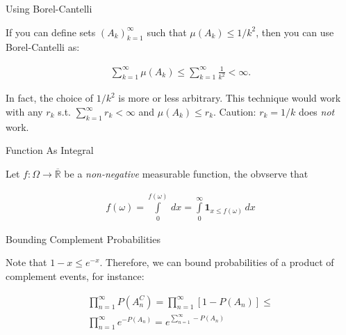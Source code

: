 \documentclass[10pt,landscape]{article}
\renewcommand{\leq}{\leqslant}
\newcommand{\Indicator}[1]{\mathbf{1}_{#1}}
\begin{document}
\begin{multicols}{3}
\begin{observation}{}{Using Borel-Cantelli}

    If you can define sets $(A_k)_{k=1}^{\infty}$ such that $\mu(A_k) \leq 1/k^2$, then you can use Borel-Cantelli as:

        \begin{align*}
            \sum_{k=1}^{\infty} \mu(A_k) \leq \sum_{k=1}^{\infty} \frac{1}{k^2} < \infty.
        \end{align*}

    In fact, the choice of $1/k^2$ is more or less arbitrary. This technique would work with any $r_k$ s.t. $\sum_{k=1}^{\infty} r_k < \infty$ and $\mu(A_k) \leq r_k$. Caution: $r_k = 1/k$ does \emph{not} work.

\end{observation}

\begin{observation}{}{Function As Integral}

    Let $f: \Omega \to \overline{\mathbb{R}}$ be a \emph{non-negative} measurable function, the obvserve that

        \begin{align*}
            f(\omega) = \int\limits_0^{f(\omega)} \, dx = \int\limits_0^{\infty} \Indicator{x \leq f(\omega)} \, dx
        \end{align*}

\end{observation}

\begin{observation}{}{Bounding Complement Probabilities}

    Note that $1 - x \leq e^{-x}$. Therefore, we can bound probabilities of a product of complement events, for instance:

        \begin{align*}
            \prod_{n = 1}^{\infty} P(A_n^C) = \prod_{n = 1}^{\infty} [1 - P(A_n)] \leq \\ \prod_{n = 1}^{\infty} e^{-P(A_n)} = e^{\sum_{n = 1}^{\infty} -P(A_n)}
        \end{align*}

\end{observation}

\end{multicols}
\end{document}

